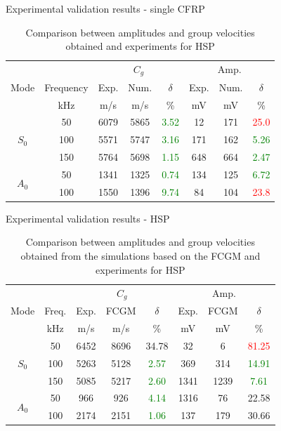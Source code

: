 \documentclass[10pt]{beamer} %
\begin{document}
\begin{frame}[label=frame14]{Experimental validation results - single CFRP}
	\begin{table}
		\centering
		\caption{\label{tab:group_velocity_cfrp} Comparison between amplitudes and group velocities  obtained and experiments for HSP}
		\begin{tabular}{cccccccc}
			\toprule
			& & \multicolumn{3}{c}{\(C_g\)} & \multicolumn{3}{c}{Amp.}\\
			Mode & Frequency & Exp. & Num. & \(\delta\)& Exp. & Num. & \(\delta\)\\
			& kHz & m/s & m/s & \% & mV & mV & \% \\
			\midrule
			\multirow{3}{*}{$S_0$} & 50 & 6079 & 5865 & \textcolor{green}{3.52}& 12 & 171 & \textcolor{red}{25.0} \\
			&100& 5571 & 5747 & \textcolor{green}{3.16} & 171 & 162 & \textcolor{green}{5.26}\\
			&150& 5764 & 5698 & \textcolor{green}{1.15} & 648 & 664 & \textcolor{green}{2.47}\\
			\midrule
			\multirow{3}{*}{$A_0$} &50& 1341 & 1325 & \textcolor{green}{0.74} & 134 & 125 & \textcolor{green}{6.72}\\
			&100& 1550 & 1396 & \textcolor{green}{9.74} & 84 & 104 & \textcolor{red}{23.8}\\
			\bottomrule
		\end{tabular}
	\end{table}
\end{frame}
\begin{frame}[label=frame14]{Experimental validation results - HSP}
	\begin{table}
		\centering
		\caption{\label{tab:group_velocity_hsp} Comparison between amplitudes and group velocities obtained from the simulations based on the FCGM and experiments for HSP}
		\begin{tabular}{cccccccc}
			\toprule
			& & \multicolumn{3}{c}{\(C_g\)} & \multicolumn{3}{c}{Amp.}\\
			Mode & Freq. & Exp. & FCGM & \(\delta\) & Exp. & FCGM & \(\delta\)\\
			& kHz & m/s & m/s & \% & mV & mV & \%\\
			\midrule
			\multirow{3}{*}{$S_0$} & 50 & 6452 & 8696 & {34.78}& 32 & 6 & \textcolor{red}{81.25}\\
			&100& 5263 & 5128 & \textcolor{green}{2.57}& 369 & 314 & \textcolor{green}{14.91}\\
			&150& 5085 & 5217 & \textcolor{green}{2.60}& 1341 & 1239 & \textcolor{green}{7.61}\\
			\midrule
			\multirow{2}{*}{$A_0$} & 50 & 966 & 926 & \textcolor{green}{4.14} & 1316& 76 & {22.58}\\
			& 100 & 2174 & 2151 & \textcolor{green}{1.06} & 137 & 179 & {30.66}\\
			\bottomrule
		\end{tabular}
	\end{table}
\end{frame}
\end{document}
